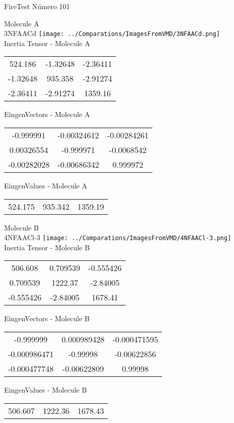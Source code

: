 \vtab[-2cm]
\begin{center}
{\large FireTest \tab Número 101}
\end{center}
\begin{multicols}{2}
\begin{center}

Molecule A \\ 
3NFAACd
\texttt{[image: ../Comparations/ImagesFromVMD/3NFAACd.png]}
\\
Inertia Tensor - Molecule A \\
\vtab

\begin{tabular}{|c c c|}
524.186	 & 	-1.32648	 & 	-2.36411	 \\
-1.32648	 & 	935.358	 & 	-2.91274	 \\
-2.36411	 & 	-2.91274	 & 	1359.16
\end{tabular}

\vtab
 EingenVectors - Molecule A     \\
\vtab
\begin{tabular}{|c c c|}
-0.999991	 & 	-0.00324612	 & 	-0.00284261	 \\
0.00326554	 & 	-0.999971	 & 	-0.0068542	 \\
-0.00282028	 & 	-0.00686342	 & 	0.999972
\end{tabular}

\vtab
 EingenValues - Molecule A     \\
\vtab
\begin{tabular}{|c c c|}
524.175	 & 	935.342	 & 	1359.19	 \\
\end{tabular}
\columnbreak

Molecule B \\ 
4NFAACl-3
\texttt{[image: ../Comparations/ImagesFromVMD/4NFAACl-3.png]}
\\
Inertia Tensor - Molecule B \\
\vtab

\begin{tabular}{|c c c|}
506.608	 & 	0.709539	 & 	-0.555426	 \\
0.709539	 & 	1222.37	 & 	-2.84005	 \\
-0.555426	 & 	-2.84005	 & 	1678.41
\end{tabular}

\vtab
 EingenVectors - Molecule B     \\
\vtab
\begin{tabular}{|c c c|}
-0.999999	 & 	0.000989428	 & 	-0.000471595	 \\
-0.000986471	 & 	-0.99998	 & 	-0.00622856	 \\
-0.000477748	 & 	-0.00622809	 & 	0.99998
\end{tabular}

\vtab
 EingenValues - Molecule B     \\
\vtab
\begin{tabular}{|c c c|}
506.607	 & 	1222.36	 & 	1678.43	 \\
\end{tabular}

\end{center}
\end{multicols}
